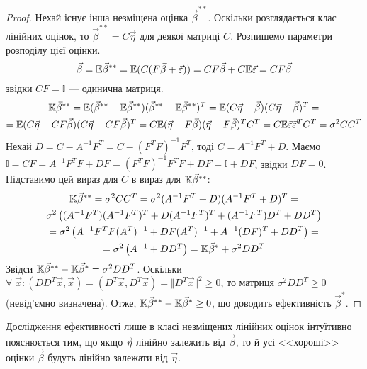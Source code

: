 \begin{proof}
    Нехай існує інша незміщена оцінка $\vec{\beta}^{**}$. Оскільки розглядається клас лінійних оцінок, то
    $\vec{\beta}^{**} = C\vec{\eta}$ для деякої матриці $C$. Розпишемо параметри розподілу цієї оцінки.
    $$\vec{\beta} = \mathbb{E}\vec{\beta}^{**} = \mathbb{E} ( C (F \vec{\beta} + \vec{\varepsilon})) = 
    C F \vec{\beta} + C\mathbb{E}\vec{\varepsilon} = C F \vec{\beta}$$ звідки $CF = \mathbb{I}$ --- одинична матриця.
    \begin{gather*}
        \mathbb{K} \vec{\beta}^{**} = \mathbb{E}(\vec{\beta}^{**} - \mathbb{E}\vec{\beta}^{**})(\vec{\beta}^{**} - \mathbb{E}\vec{\beta}^{**})^T = 
        \mathbb{E} (C\vec{\eta} - \vec{\beta})(C\vec{\eta} - \vec{\beta})^T = \\
        = \mathbb{E} (C\vec{\eta} - C F\vec{\beta})(C\vec{\eta} - C F\vec{\beta})^T = 
        C \mathbb{E} (\vec{\eta} - F\vec{\beta})(\vec{\eta} - F\vec{\beta})^T C^T = 
        C \mathbb{E} \vec{\varepsilon}\vec{\varepsilon}^T C^T = \sigma^2 C C^T
    \end{gather*}
    Нехай $D = C - A^{-1}F^T = C - (F^T F)^{-1} F^T$, тоді $C = A^{-1}F^T + D$.
    Маємо $\mathbb{I} = C F = A^{-1}F^T F + D F = (F^T F)^{-1} F^T F + D F = \mathbb{I} + DF$,
    звідки $D F = 0$. Підставимо цей вираз для $C$ в вираз для $\mathbb{K} \vec{\beta}^{**}$:
    \begin{gather*}
        \mathbb{K} \vec{\beta}^{**} = \sigma^2 C C^T = \sigma^2 (A^{-1}F^T + D)(A^{-1}F^T + D)^T = \\ =
        \sigma^2 \left(
            (A^{-1}F^T)(A^{-1}F^T)^T + D (A^{-1}F^T)^T + (A^{-1}F^T)D^T + D D^T
        \right) = \\ =
        \sigma^2 \left(
            A^{-1}F^T F (A^T)^{-1} + D F (A^T)^{-1} + A^{-1} (DF)^T + D D^T
        \right) = \\ =
        \sigma^2 \left(
            A^{-1} + D D^T
        \right) = \mathbb{K} \vec{\beta}^* + \sigma^2 D D^T
    \end{gather*}
    Звідси $\mathbb{K} \vec{\beta}^{**} - \mathbb{K} \vec{\beta}^* = \sigma^2 D D^T$. Оскільки
    $\forall \; \vec{x} : \left(D D^T \vec{x}, \vec{x}\right) = \left(D^T\vec{x}, D^T\vec{x}\right) = 
    \Vert D^T \vec{x} \Vert^2 \geq 0$, то матриця $\sigma^2 D D^T \geq 0$ (невід'ємно визначена).
    Отже, $\mathbb{K} \vec{\beta}^{**} - \mathbb{K} \vec{\beta}^* \geq 0$, що доводить ефективність $\vec{\beta}^*$.
\end{proof}
\begin{remark}
    Дослідження ефективності лише в класі незміщених лінійних оцінок інтуїтивно пояснюється тим, що якщо $\vec{\eta}$ лінійно залежить від $\vec{\beta}$,
    то й усі <<хороші>> оцінки $\vec{\beta}$ будуть лінійно залежати від $\vec{\eta}$.
\end{remark}

